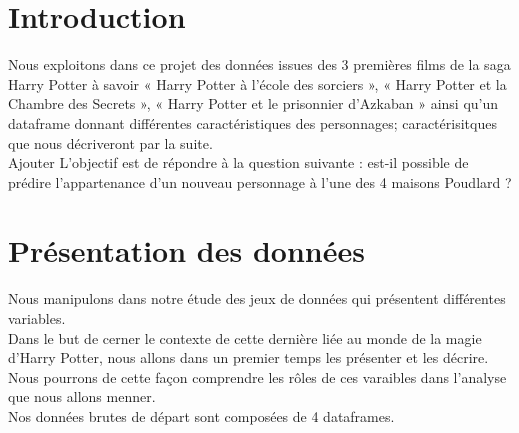 \documentclass[11pt]{article}
\begin{document}
\newpage


\thispagestyle{plain} %
\mbox{}

\renewcommand{\contentsname}{Sommaire}
\tableofcontents
\newpage

\section{Introduction}

Nous exploitons dans ce projet des données issues des 3 premières films de la saga Harry Potter à savoir « Harry Potter à l'école des sorciers », « Harry Potter et la Chambre des Secrets », « Harry Potter et le prisonnier d’Azkaban » ainsi qu'un dataframe donnant différentes caractéristiques des personnages; caractérisitques que nous décriveront par la suite.\\
Ajouter 
L’objectif est de répondre à la question suivante : est-il possible de prédire l’appartenance d’un nouveau personnage à l’une des 4 maisons Poudlard ?


\newpage

\section{Présentation des données}


Nous manipulons dans notre étude des jeux de données qui présentent différentes variables.\\

Dans le but de cerner le contexte de cette dernière liée au monde de la magie d'Harry Potter, nous allons dans un premier temps les présenter et les décrire. Nous pourrons de cette façon comprendre les rôles de ces varaibles dans l'analyse que nous allons menner. \\
Nos données brutes de départ sont composées de 4 dataframes.
\end{document}
